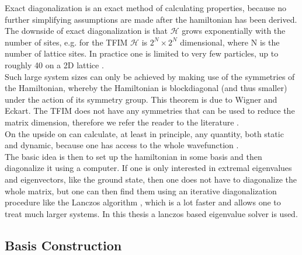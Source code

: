 \documentclass{article}
\begin{document}
Exact diagonalization is an exact method of calculating properties,
because no further simplifying assumptions are made after the
hamiltonian has been derived.\\
The downside of exact diagonalization is that $\mathcal{H}$ grows
exponentially with the number of sites, e.g. for the TFIM
$\mathcal{H}$ is $2^N \times 2^N$ dimensional, where N is the number
of lattice sites. In practice one is limited to very
few particles, up to roughly 40 on a 2D lattice \cite{Noack}.\\
Such large system sizes can only be achieved by making use of the
symmetries of the Hamiltonian, whereby the Hamiltonian is blockdiagonal
(and thus smaller)
under the action of its symmetry group. This theorem is due to Wigner
and Eckart. The TFIM does not
have any symmetries that can be used to reduce the matrix dimension,
therefore we refer the reader to the literature
\cite{Laflorencie,Noack,Fehske}.\\
On the upside on can calculate, at least in principle, any quantity,
both static and dynamic, because one has access to the whole
wavefunction \cite{Noack}.\\
The basic idea is then to set up the hamiltonian in some basis and
then diagonalize it using a computer. If one is only interested in
extremal eigenvalues and eigenvectors, like the ground state, then one
does not have to diagonalize the whole matrix, but one can then find
them using an iterative diagonalization procedure like the Lanczos
algorithm \cite{Lanczos}, which is a lot faster and allows one to treat much larger
systems. In this thesis a lanczos based eigenvalue solver is used.\\

\subsection{Basis Construction}
\end{document}
